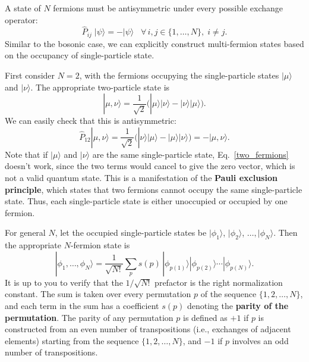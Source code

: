 \documentclass[pra,12pt]{revtex4}
\begin{document}
A state of $N$ fermions must be antisymmetric under every possible
exchange operator:
\begin{equation}
  \hat{P}_{ij}\; |\psi\rangle = -|\psi\rangle \;\;\; \forall\, i,j\in\{1,\dots,N\}, \; i\ne j.
\end{equation}
Similar to the bosonic case, we can explicitly construct multi-fermion
states based on the occupancy of single-particle state.

First consider $N=2$, with the fermions occupying the single-particle
states $|\mu\rangle$ and $|\nu\rangle$.  The appropriate two-particle
state is
\begin{equation}
  |\mu,\nu\rangle = \frac{1}{\sqrt{2}}
  \Big(|\mu\rangle|\nu\rangle - |\nu\rangle|\mu\rangle\Big).
  \label{two_fermions}
\end{equation}
We can easily check that this is antisymmetric:
\begin{equation}
  \hat{P}_{12} |\mu,\nu\rangle = \frac{1}{\sqrt{2}}
  \Big(|\nu\rangle|\mu\rangle - |\mu\rangle|\nu\rangle\Big)
  = - |\mu,\nu\rangle.
\end{equation}
Note that if $|\mu\rangle$ and $|\nu\rangle$ are the same
single-particle state, Eq.~\eqref{two_fermions} doesn't work, since
the two terms would cancel to give the zero vector, which is not a
valid quantum state.  This is a manifestation of the \textbf{Pauli
  exclusion principle}, which states that two fermions cannot occupy
the same single-particle state.  Thus, each single-particle state is
either unoccupied or occupied by one fermion.

For general $N$, let the occupied single-particle states be
$|\phi_1\rangle$, $|\phi_2\rangle$, $\dots, |\phi_N\rangle$.  Then the
appropriate $N$-fermion state is
\begin{equation}
  |\phi_1,\dots,\phi_N\rangle = \frac{1}{\sqrt{N!}} \sum_p s(p)\, |\phi_{p(1)}\rangle |\phi_{p(2)}\rangle \cdots |\phi_{p(N)}\rangle.
  \label{Nfermions}
\end{equation}
It is up to you to verify that the $1/\sqrt{N!}$ prefactor is the
right normalization constant.  The sum is taken over every permutation
$p$ of the sequence $\{1,2,\dots,N\}$, and each term in the sum has a
coefficient $s(p)$ denoting the \textbf{parity of the permutation}.
The parity of any permutation $p$ is defined as $+1$ if $p$ is
constructed from an even number of transpositions (i.e., exchanges of
adjacent elements) starting from the sequence $\{1,2,\dots,N\}$, and
$-1$ if $p$ involves an odd number of transpositions.
\end{document}
